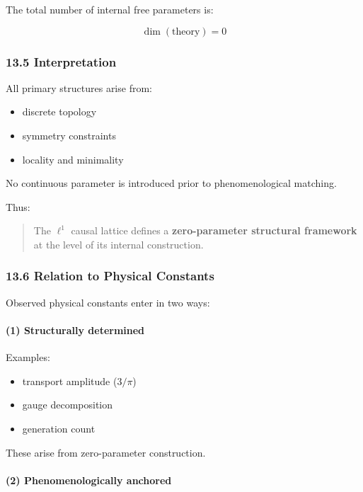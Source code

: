 \documentclass[
]{article}
\providecommand{\tightlist}{%
  \setlength{\itemsep}{0pt}\setlength{\parskip}{0pt}}
\begin{document}
The total number of internal free parameters is:

\[
\dim(\text{theory}) = 0
\]

\hypertarget{interpretation-4}{%
\subsubsection{13.5 Interpretation}\label{interpretation-4}}

All primary structures arise from:

\begin{itemize}
\tightlist
\item
  discrete topology
\item
  symmetry constraints
\item
  locality and minimality
\end{itemize}

No continuous parameter is introduced prior to phenomenological
matching.

Thus:

\begin{quote}
The \(\ell^1\) causal lattice defines a \textbf{zero-parameter
structural framework} at the level of its internal construction.
\end{quote}

\hypertarget{relation-to-physical-constants}{%
\subsubsection{13.6 Relation to Physical
Constants}\label{relation-to-physical-constants}}

Observed physical constants enter in two ways:

\hypertarget{structurally-determined}{%
\paragraph{(1) Structurally determined}\label{structurally-determined}}

Examples:

\begin{itemize}
\tightlist
\item
  transport amplitude (\(3/\pi\))
\item
  gauge decomposition
\item
  generation count
\end{itemize}

These arise from zero-parameter construction.

\hypertarget{phenomenologically-anchored}{%
\paragraph{(2) Phenomenologically
anchored}\label{phenomenologically-anchored}}
\end{document}
